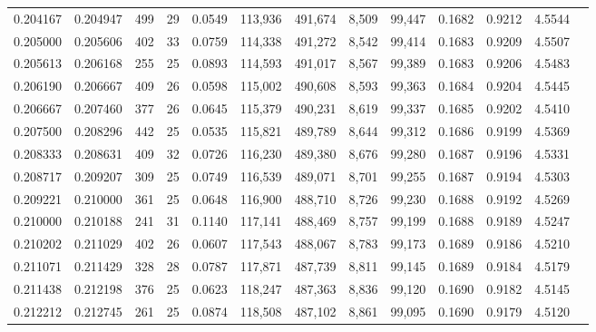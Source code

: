 \begin{tabular}{rrrrrrrrrrrrr}
0.204167 & 0.204947 &    499 &    29 &                                     0.0549 & 113,936 & 491,674 &   8,509 &  99,447 & 0.1682 & 0.9212 & 4.5544 \\
0.205000 & 0.205606 &    402 &    33 &                                     0.0759 & 114,338 & 491,272 &   8,542 &  99,414 & 0.1683 & 0.9209 & 4.5507 \\
0.205613 & 0.206168 &    255 &    25 &                                     0.0893 & 114,593 & 491,017 &   8,567 &  99,389 & 0.1683 & 0.9206 & 4.5483 \\
0.206190 & 0.206667 &    409 &    26 &                                     0.0598 & 115,002 & 490,608 &   8,593 &  99,363 & 0.1684 & 0.9204 & 4.5445 \\
0.206667 & 0.207460 &    377 &    26 &                                     0.0645 & 115,379 & 490,231 &   8,619 &  99,337 & 0.1685 & 0.9202 & 4.5410 \\
0.207500 & 0.208296 &    442 &    25 &                                     0.0535 & 115,821 & 489,789 &   8,644 &  99,312 & 0.1686 & 0.9199 & 4.5369 \\
0.208333 & 0.208631 &    409 &    32 &                                     0.0726 & 116,230 & 489,380 &   8,676 &  99,280 & 0.1687 & 0.9196 & 4.5331 \\
0.208717 & 0.209207 &    309 &    25 &                                     0.0749 & 116,539 & 489,071 &   8,701 &  99,255 & 0.1687 & 0.9194 & 4.5303 \\
0.209221 & 0.210000 &    361 &    25 &                                     0.0648 & 116,900 & 488,710 &   8,726 &  99,230 & 0.1688 & 0.9192 & 4.5269 \\
0.210000 & 0.210188 &    241 &    31 &                                     0.1140 & 117,141 & 488,469 &   8,757 &  99,199 & 0.1688 & 0.9189 & 4.5247 \\
0.210202 & 0.211029 &    402 &    26 &                                     0.0607 & 117,543 & 488,067 &   8,783 &  99,173 & 0.1689 & 0.9186 & 4.5210 \\
0.211071 & 0.211429 &    328 &    28 &                                     0.0787 & 117,871 & 487,739 &   8,811 &  99,145 & 0.1689 & 0.9184 & 4.5179 \\
0.211438 & 0.212198 &    376 &    25 &                                     0.0623 & 118,247 & 487,363 &   8,836 &  99,120 & 0.1690 & 0.9182 & 4.5145 \\
0.212212 & 0.212745 &    261 &    25 &                                     0.0874 & 118,508 & 487,102 &   8,861 &  99,095 & 0.1690 & 0.9179 & 4.5120 \\

\end{tabular}
